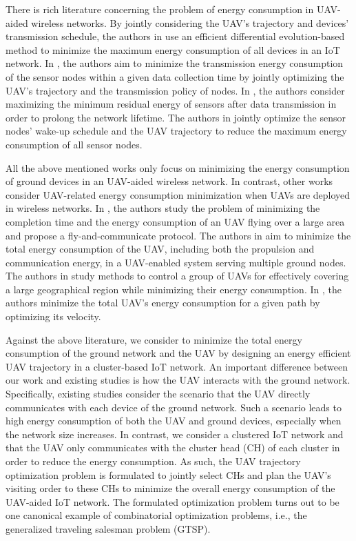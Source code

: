 \documentclass[journal]{IEEEtran}
\begin{document}
	
	 There is rich literature concerning the problem of energy consumption in UAV-aided wireless networks. By jointly considering the UAV's trajectory and devices' transmission schedule, the authors in \cite{Z. Wang} use an efficient differential evolution-based method to minimize the maximum energy consumption of all devices in an IoT network. In \cite{B. Liu}, the authors aim to minimize the transmission energy consumption of the sensor nodes within a given data collection time by jointly optimizing the UAV's trajectory and the transmission policy of nodes. In \cite{J. Baek}, the authors consider maximizing the minimum residual energy of sensors after data transmission in order to prolong the network lifetime. The authors in \cite{C. Zhan Y. Zeng} jointly optimize the sensor nodes' wake-up schedule and the UAV trajectory to reduce the maximum energy consumption of all sensor nodes.

     All the above mentioned works only focus on minimizing the energy consumption of ground devices in an UAV-aided wireless network. In contrast, other works consider UAV-related energy consumption minimization when UAVs are deployed in wireless networks. In \cite{Q. Song}, the authors study the problem of minimizing the completion time and the energy consumption of an UAV flying over a large area and propose a fly-and-communicate protocol. The authors in \cite{Y. Zeng} aim to minimize the total energy consumption of the UAV, including both the propulsion and communication energy, in a UAV-enabled system serving multiple ground nodes. The authors in \cite{C. H. Liu} study methods to control a group of UAVs for effectively covering a large geographical region while minimizing their energy consumption. In \cite{D. H. Tran}, the authors minimize the total UAV's energy consumption for a given path by optimizing its velocity.

	
     Against the above literature, {we consider to minimize the total energy consumption} of the ground network and the UAV by designing an energy efficient UAV trajectory in a cluster-based IoT network. An important difference between our work and existing studies is how the UAV interacts with the ground network. Specifically, existing studies consider the scenario that the UAV directly communicates with each device of the ground network. Such a scenario leads to high energy consumption of both the UAV and ground devices, especially when the network size increases. In contrast, we consider a clustered IoT network and that the UAV only communicates with the cluster head (CH) of each cluster in order to reduce the energy consumption. As such, the UAV trajectory optimization problem is formulated to jointly select CHs and plan the UAV's visiting order to these CHs to minimize the overall energy consumption of the UAV-aided IoT network. {The formulated optimization problem turns out to be one canonical example of combinatorial optimization problems, i.e., the generalized traveling salesman problem (GTSP).}
\end{document}
